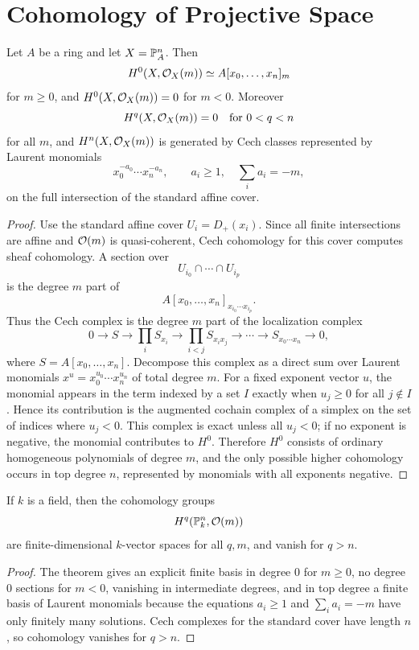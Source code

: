 \section{Cohomology of Projective Space}

\begin{theorem}
Let \(A\) be a ring and let \(X=\mathbb{P}^n_A\).  Then
\[
    H^0(X,\mathcal{O}_X(m))\simeq A[x_0,\ldots,x_n]_m
\]
for \(m\ge0\), and \(H^0(X,\mathcal{O}_X(m))=0\) for \(m<0\).  Moreover
\[
    H^q(X,\mathcal{O}_X(m))=0
    \quad\text{for }0<q<n
\]
for all \(m\), and \(H^n(X,\mathcal{O}_X(m))\) is generated by Cech classes represented
by Laurent monomials
\[
    x_0^{-a_0}\cdots x_n^{-a_n},\qquad a_i\ge1,\quad
    \sum_i a_i=-m,
\]
on the full intersection of the standard affine cover.
\end{theorem}

\begin{proof}
Use the standard affine cover \(U_i=D_+(x_i)\).  Since all finite intersections
are affine and \(\mathcal{O}(m)\) is quasi-coherent, Cech cohomology for this cover
computes sheaf cohomology.  A section over
\[
    U_{i_0}\cap\cdots\cap U_{i_p}
\]
is the degree \(m\) part of
\[
    A[x_0,\ldots,x_n]_{x_{i_0}\cdots x_{i_p}}.
\]
Thus the Cech complex is the degree \(m\) part of the localization complex
\[
0\to S\to\prod_i S_{x_i}\to
\prod_{i<j}S_{x_ix_j}\to\cdots\to S_{x_0\cdots x_n}\to0,
\]
where \(S=A[x_0,\ldots,x_n]\).  Decompose this complex as a direct sum over
Laurent monomials \(x^u=x_0^{u_0}\cdots x_n^{u_n}\) of total degree \(m\).  For
a fixed exponent vector \(u\), the monomial appears in the term indexed by a
set \(I\) exactly when \(u_j\ge0\) for all \(j\notin I\).  Hence its
contribution is the augmented cochain complex of a simplex on the set of
indices where \(u_j<0\).  This complex is exact unless all \(u_j<0\); if no
exponent is negative, the monomial contributes to \(H^0\).  Therefore \(H^0\)
consists of ordinary homogeneous polynomials of degree \(m\), and the only
possible higher cohomology occurs in top degree \(n\), represented by monomials
with all exponents negative.
\end{proof}

\begin{corollary}
If \(k\) is a field, then the cohomology groups
\[
    H^q(\mathbb{P}^n_k,\mathcal{O}(m))
\]
are finite-dimensional \(k\)-vector spaces for all \(q,m\), and vanish for
\(q>n\).
\end{corollary}

\begin{proof}
The theorem gives an explicit finite basis in degree \(0\) for \(m\ge0\), no
degree \(0\) sections for \(m<0\), vanishing in intermediate degrees, and in top
degree a finite basis of Laurent monomials because the equations \(a_i\ge1\)
and \(\sum_i a_i=-m\) have only finitely many solutions.  Cech complexes for
the standard cover have length \(n\), so cohomology vanishes for \(q>n\).
\end{proof}

